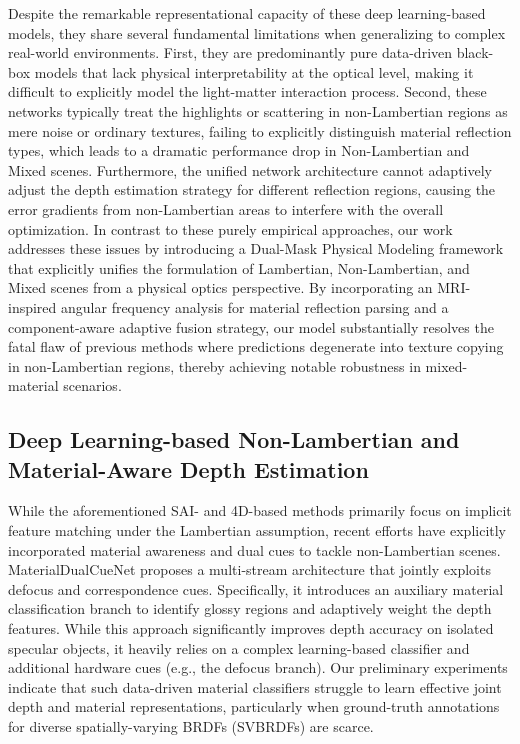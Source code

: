 Despite the remarkable representational capacity of these deep learning-based models, they share several fundamental limitations when generalizing to complex real-world environments. First, they are predominantly pure data-driven black-box models that lack physical interpretability at the optical level, making it difficult to explicitly model the light-matter interaction process. Second, these networks typically treat the highlights or scattering in non-Lambertian regions as mere noise or ordinary textures, failing to explicitly distinguish material reflection types, which leads to a dramatic performance drop in Non-Lambertian and Mixed scenes. Furthermore, the unified network architecture cannot adaptively adjust the depth estimation strategy for different reflection regions, causing the error gradients from non-Lambertian areas to interfere with the overall optimization. In contrast to these purely empirical approaches, our work addresses these issues by introducing a Dual-Mask Physical Modeling framework that explicitly unifies the formulation of Lambertian, Non-Lambertian, and Mixed scenes from a physical optics perspective. By incorporating an MRI-inspired angular frequency analysis for material reflection parsing and a component-aware adaptive fusion strategy, our model substantially resolves the fatal flaw of previous methods where predictions degenerate into texture copying in non-Lambertian regions, thereby achieving notable robustness in mixed-material scenarios.

\subsection{Deep Learning-based Non-Lambertian and Material-Aware Depth Estimation}

While the aforementioned SAI- and 4D-based methods primarily focus on implicit feature matching under the Lambertian assumption, recent efforts have explicitly incorporated material awareness and dual cues to tackle non-Lambertian scenes. MaterialDualCueNet \cite{MaterialDualCueNetdualcuesd} proposes a multi-stream architecture that jointly exploits defocus and correspondence cues. Specifically, it introduces an auxiliary material classification branch to identify glossy regions and adaptively weight the depth features. While this approach significantly improves depth accuracy on isolated specular objects, it heavily relies on a complex learning-based classifier and additional hardware cues (e.g., the defocus branch). Our preliminary experiments indicate that such data-driven material classifiers struggle to learn effective joint depth and material representations, particularly when ground-truth annotations for diverse spatially-varying BRDFs (SVBRDFs) are scarce.

